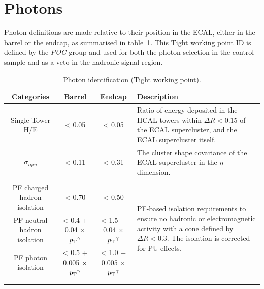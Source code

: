 \section{Photons}  %
\label{sec:objects_photons}

Photon definitions are made relative to their position in the ECAL,
either
in the barrel or the endcap, as summarised in table~\ref{tab:photon-id-egamma}. 
This Tight working point ID is defined by the \emph{POG} group
\cite{ref:photonidtwiki} and used for both the photon
selection in the \gj control sample and as a veto in the hadronic signal region.

\begin{table}[t]
  \caption{Photon identification (Tight working point).\label{tab:photon-id-egamma}}
  \centering
  \scriptsize
  \begin{tabular}{ cccp{4.4cm} }
    \hline
    \hline
    Categories                    & Barrel                             & Endcap
    & Description                         \\
    \hline
    Single Tower H/E              & < 0.05                               & < 0.05                               
    & Ratio of energy deposited in the HCAL towers within $\Delta R<0.15$ of the ECAL 
    supercluster, and the ECAL supercluster itself. \\
    $\sigma_{i\eta i\eta}$        & < 0.11                               & < 0.31 & 
    The cluster shape covariance of the ECAL supercluster in the $\eta$
    dimension. \\
    &&&\multirow{4}{4.4cm}{PF-based isolation requirements to ensure no hadronic
    or electromagnetic 
    activity with a cone defined by $\Delta R < 0.3$. The isolation is
    corrected for PU effects.}\\
    PF charged hadron isolation   & < 0.70                               & < 0.50                               & \\
    PF neutral hadron isolation   & < 0.4 + 0.04 $\times$ ${p_{\text T}}^{\gamma}$  & < 1.5 + 0.04 $\times$ ${p_{\text T}}^{\gamma}$&
    \\
    PF photon isolation           & < 0.5 + 0.005 $\times$ ${p_{\text T}}^{\gamma}$ & < 1.0 + 0.005 $\times$ ${p_{\text T}}^{\gamma}$& \\
    \\
    \\
    \hline
    \hline
  \end{tabular}
\end{table}

